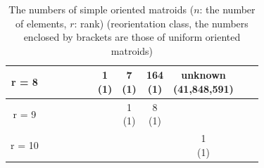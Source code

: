 \documentclass{article}
\begin{document}
\begin{table}[h]
\begin{center}
{\begin{tabular}{c | c | c | c | c | c | c | c | c | c | c | c |}
 \hline
 r = 8  &       &       &        &   &      & \shortstack{1 \\ (1)}   & \shortstack{7 \\ (1)} & \shortstack{164 \\ (1)} & \shortstack{unknown \\ (41,848,591)}\\
 \hline
 r = 9  &       &       &        &    &     &   & \shortstack{1 \\ (1)} & \shortstack{8 \\ (1)} & \\
 \hline
 r = 10  &       &       &        &     &      &  &  & & \shortstack{1 \\ (1)} \\
 \hline
\end{tabular}
}
\end{center}
\caption{The numbers of simple oriented matroids ($n$: the number of elements, $r$: rank)
(reorientation class, the numbers enclosed by brackets are those of uniform oriented matroids)
\cite{AAK02,AK06,BRG90,C71,FF02,FF03,GSL89,G03,G72,H71,R88}}
\label{existing1}
\end{table} 
\end{document}
